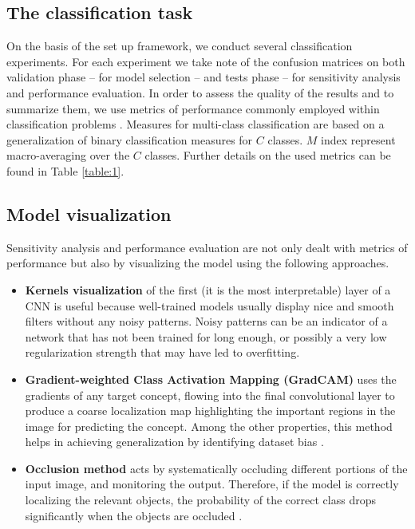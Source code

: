 \subsection{The classification task}
On the basis of the set up framework, we conduct several classification experiments. For each experiment we take note of the confusion matrices on both validation phase -- for model selection -- and tests phase -- for sensitivity analysis and performance evaluation. In order to assess the quality of the results and to summarize them, we use metrics of performance commonly employed within classification problems \cite{ref34}. Measures for multi-class classification are based on a generalization of binary classification measures for $C$ classes. $M$ index represent macro-averaging over the $C$ classes. Further details on the used metrics can be found in Table \ref{table:1}.
\subsection{Model visualization}
Sensitivity analysis and performance evaluation are not only dealt with metrics of performance but also by visualizing the model using the following approaches.
\begin{itemize}
	\item \textbf{Kernels visualization} of the first (it is the most interpretable) layer of a CNN is useful because well-trained models usually display nice and smooth filters without any noisy patterns. Noisy patterns can be an indicator of a network that has not been trained for long enough, or possibly a very low regularization strength that may have led to overfitting.
	\vspace{-5pt}
	\item \textbf{Gradient-weighted Class Activation Mapping (GradCAM)} uses the gradients of any target concept, flowing into the final convolutional layer to produce a coarse localization map highlighting the important regions in the image for predicting the concept. Among the other properties, this method helps in achieving generalization by identifying dataset bias \cite{ref12}.
	\vspace{-5pt}
	\item \textbf{Occlusion method} acts by systematically occluding different portions of the input image, and monitoring the output. Therefore, if the model is correctly localizing the relevant objects, the probability of the correct class drops significantly when the objects are occluded \cite{ref13}.
\end{itemize}